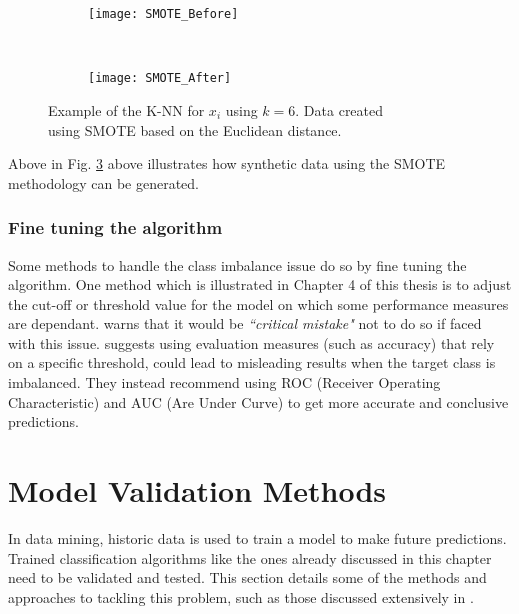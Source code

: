 \begin{figure}[H]
	\centering
	\begin{subfigure}[b]{0.32\textwidth}
		\captionsetup{font=scriptsize}
		\texttt{[image: SMOTE\_Before]}\caption{}
		\label{fig:SMOTE_Before}
	\end{subfigure}  ~\quad
	\begin{subfigure}[b]{0.32\textwidth}
		\captionsetup{font=scriptsize}
		\texttt{[image: SMOTE\_After]}
		\caption{}
		\label{fig:SMOTE_After}
	\end{subfigure}
	\caption{Example of the K-NN for $x_i$ using $k = 6$. Data created \\ using SMOTE based on the Euclidean distance.\\
		\cite[Source:][]{he_learning_2009}}
	\label{fig:smoteExample}
\end{figure}

Above in Fig. \ref{fig:smoteExample} above illustrates how synthetic data using the SMOTE methodology can be generated.


\subsubsection{Fine tuning the algorithm}
Some methods to handle the class imbalance issue do so by fine tuning the algorithm. One method which is illustrated in Chapter 4 of this thesis is to adjust the cut-off or threshold value for the model on which some performance measures are dependant. \cite{provost_machine_2000} warns that it would be \textit{``critical mistake"} not to do so if faced with this issue. \cite{chawla_editorial:_2004} suggests using evaluation measures (such as accuracy) that rely on a specific threshold, could lead to misleading results when the target class is imbalanced. They instead recommend using ROC (Receiver Operating Characteristic) and AUC (Are
Under Curve) to get more accurate and conclusive predictions.


\section{Model Validation Methods}\label{sec:modelValid}
In data mining, historic data is used to train a model to make future predictions. Trained classification algorithms like the ones already discussed in this chapter need to be validated and tested. This section details some of the methods and approaches to tackling this problem, such as those discussed extensively in \citep{refaeilzadeh_cross-validation_2009}.

